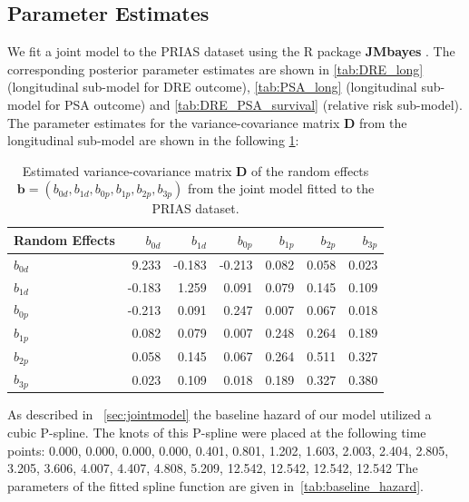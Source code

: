 \subsection{Parameter Estimates}
We fit a joint model to the PRIAS dataset using the R package \textbf{JMbayes} \citep{rizopoulosJMbayes}. The corresponding posterior parameter estimates are shown in \ref{tab:DRE_long} (longitudinal sub-model for DRE outcome), \ref{tab:PSA_long} (longitudinal sub-model for PSA outcome) and \ref{tab:DRE_PSA_survival} (relative risk sub-model). The parameter estimates for the variance-covariance matrix $\boldsymbol{D}$ from the longitudinal sub-model are shown in the following \ref{tab:D_matrix}:

\begin{table}[!htb]
\begin{center}
\caption{Estimated variance-covariance matrix $\boldsymbol{D}$ of the random effects ${\boldsymbol{b}=(b_{0d},b_{1d},b_{0p}, b_{1p}, b_{2p}, b_{3p})}$ from the joint model fitted to the PRIAS dataset.}
\label{tab:D_matrix}
\begin{tabular}{lrrrrrr}
\hline
\hline
Random Effects    & $b_{0d}$    & $b_{1d}$    & $b_{0p}$    & $b_{1p}$   & $b_{2p}$   & $b_{3p}$ \\
\hline
$b_{0d}$ & 9.233 & -0.183 & -0.213 & 0.082 & 0.058 & 0.023 \\
$b_{1d}$ & -0.183 & 1.259 & 0.091 & 0.079 & 0.145 & 0.109 \\
\hline
$b_{0p}$ & -0.213 & 0.091 & 0.247 & 0.007 & 0.067 & 0.018 \\
$b_{1p}$ & 0.082 & 0.079 & 0.007 & 0.248 & 0.264 & 0.189 \\
$b_{2p}$ & 0.058 & 0.145 & 0.067 & 0.264 & 0.511 & 0.327 \\
$b_{3p}$ & 0.023 & 0.109 & 0.018 & 0.189 & 0.327 & 0.380 \\
\hline
\end{tabular}
\end{center}
\end{table}

As described in ~\ref{sec:jointmodel} the baseline hazard of our model utilized a cubic P-spline. The knots of this P-spline were placed at the following time points:
0.000, 0.000, 0.000, 0.000, 0.401, 0.801, 1.202, 1.603, 2.003, 2.404, 2.805, 3.205, 3.606, 4.007, 4.407, 4.808, 5.209, 12.542, 12.542, 12.542, 12.542
The parameters of the fitted spline function are given in~\ref{tab:baseline_hazard}.

